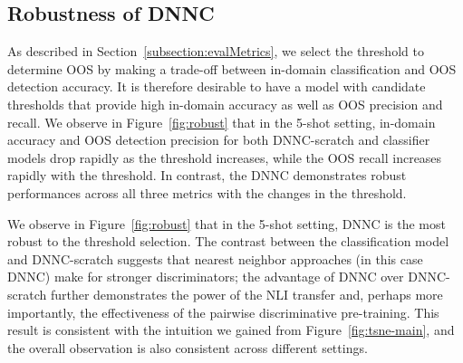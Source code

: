 \subsection{Robustness of DNNC}
As described in Section~\ref{subsection:evalMetrics}, we select the threshold to determine OOS by making a trade-off between in-domain classification and OOS detection accuracy.
It is therefore desirable to have a model with candidate thresholds that provide high in-domain accuracy as well as OOS precision and recall. 
We observe in Figure~\ref{fig:robust} that in the 5-shot setting, in-domain accuracy and OOS detection precision for both DNNC-scratch and classifier models drop rapidly as the threshold increases, while the OOS recall increases rapidly with the threshold. In contrast, the DNNC demonstrates robust performances across all three metrics with the changes in the threshold. \fi



We observe in Figure~\ref{fig:robust} that in the 5-shot setting, DNNC is the most robust to the threshold selection.
The contrast between the classification model and DNNC-scratch suggests that nearest neighbor approaches (in this case DNNC) make for stronger discriminators; the advantage of DNNC over DNNC-scratch further demonstrates the power of the NLI transfer and, perhaps more importantly, the effectiveness of the pairwise discriminative pre-training.
This result is consistent with the intuition we gained from Figure~\ref{fig:tsne-main}, and the overall observation is also consistent across different settings.



